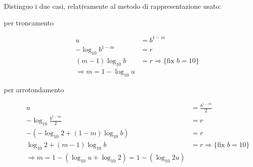 Distinguo i due casi, relativamente al metodo di rappresentazione usato:
\begin{description}
	\item[per troncamento] 
		\begin{displaymath}
		\begin{split}
			u &= b^{1-m} \\
			-\log_{10}{b^{1-m}} &= r \\
			(m-1)\log_{10}{b} &= r \Rightarrow \lbrace \text{fix } b = 10 \rbrace \\
			\Rightarrow m = 1 - \log_{10}{u}			
		\end{split}
		\end{displaymath}

	\item[per arrotondamento] 
		\begin{displaymath}
		\begin{split}
			u &= \frac{b^{1-m}}{2} \\
			-\log_{10}{\frac{b^{1-m}}{2}} &= r \\
			-\left( -\log_{10}{2} + (1-m)\log_{10}{b} \right) &= r \\
			\log_{10}{2} + (m-1)\log_{10}{b} &= r \Rightarrow 
				\lbrace \text{fix } b = 10 \rbrace \\
			\Rightarrow m = 1 - (\log_{10}{u} + \log_{10}{2}) = 1 - (\log_{10}{2u})
		\end{split}
		\end{displaymath}
\end{description}

